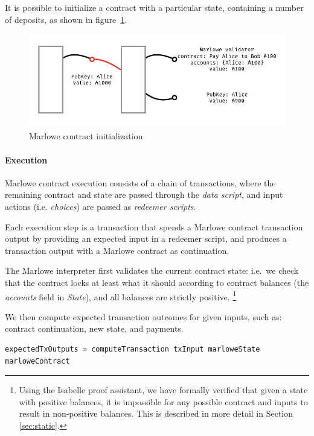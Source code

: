 \documentclass[runningheads]{llncs}
\begin{document}
It is possible to initialize a contract with a particular state, containing a number of deposits,
as shown in figure~\ref{fig:marlowe-init}.

\begin{figure}[!h]
\centering
\includegraphics[width=1\textwidth]{figures/Marlowe3-Figures-002.jpeg}
\caption{Marlowe contract initialization}
\label{fig:marlowe-init}
\end{figure}

\paragraph{Execution}

Marlowe contract execution consists of a chain of transactions,
where the remaining contract and state are passed through the \emph{data script},
and input actions (i.e. \emph{choices}) are passed as \emph{redeemer scripts}.

Each execution step is a transaction that spends a Marlowe contract transaction output by providing
an expected input in a redeemer script,
and produces a transaction output with a Marlowe contract as continuation.

The Marlowe interpreter first validates the current contract state: i.e.\
we check that the contract locks at least what it should according
to contract balances (the \emph{accounts} field in \emph{State}),
and all balances are strictly positive.
\footnote{
Using the Isabelle proof assistant, we have formally verified that given a state with positive balances,
it is impossible for any possible contract and inputs to result in non-positive balances.
This is described in more detail in Section \ref{sec:static}.}

We then compute expected transaction outcomes for given inputs, such as:
contract continuation, new state, and payments.

\begin{verbatim}
expectedTxOutputs = computeTransaction txInput marloweState marloweContract
\end{verbatim}
\end{document}
